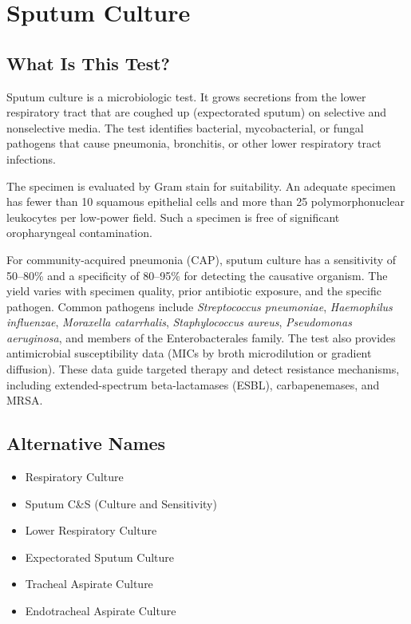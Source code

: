 \chapter{Sputum Culture}

\section*{What Is This Test?}
Sputum culture is a microbiologic test. It grows secretions from the lower respiratory tract that are coughed up (expectorated sputum) on selective and nonselective media. The test identifies bacterial, mycobacterial, or fungal pathogens that cause pneumonia, bronchitis, or other lower respiratory tract infections.

The specimen is evaluated by Gram stain for suitability. An adequate specimen has fewer than 10 squamous epithelial cells and more than 25 polymorphonuclear leukocytes per low-power field. Such a specimen is free of significant oropharyngeal contamination.

For community-acquired pneumonia (CAP), sputum culture has a sensitivity of 50--80\% and a specificity of 80--95\% for detecting the causative organism. The yield varies with specimen quality, prior antibiotic exposure, and the specific pathogen. Common pathogens include \textit{Streptococcus pneumoniae}, \textit{Haemophilus influenzae}, \textit{Moraxella catarrhalis}, \textit{Staphylococcus aureus}, \textit{Pseudomonas aeruginosa}, and members of the Enterobacterales family. The test also provides antimicrobial susceptibility data (MICs by broth microdilution or gradient diffusion). These data guide targeted therapy and detect resistance mechanisms, including extended-spectrum beta-lactamases (ESBL), carbapenemases, and MRSA.

\section*{Alternative Names}
\begin{itemize}
  \item Respiratory Culture
  \item Sputum C\&S (Culture and Sensitivity)
  \item Lower Respiratory Culture
  \item Expectorated Sputum Culture
  \item Tracheal Aspirate Culture
  \item Endotracheal Aspirate Culture
\end{itemize}
